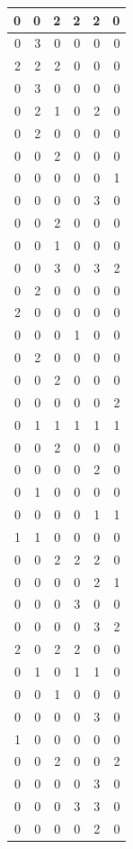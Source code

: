 \documentclass[
  12pt,
]{krantz}
\begin{document}
\begin{tabular}{r|r|r|r|r|r}
\hline
0 & 0 & 2 & 2 & 2 & 0\\
\hline
0 & 3 & 0 & 0 & 0 & 0\\
\hline
2 & 2 & 2 & 0 & 0 & 0\\
\hline
0 & 3 & 0 & 0 & 0 & 0\\
\hline
0 & 2 & 1 & 0 & 2 & 0\\
\hline
0 & 2 & 0 & 0 & 0 & 0\\
\hline
0 & 0 & 2 & 0 & 0 & 0\\
\hline
0 & 0 & 0 & 0 & 0 & 1\\
\hline
0 & 0 & 0 & 0 & 3 & 0\\
\hline
0 & 0 & 2 & 0 & 0 & 0\\
\hline
0 & 0 & 1 & 0 & 0 & 0\\
\hline
0 & 0 & 3 & 0 & 3 & 2\\
\hline
0 & 2 & 0 & 0 & 0 & 0\\
\hline
2 & 0 & 0 & 0 & 0 & 0\\
\hline
0 & 0 & 0 & 1 & 0 & 0\\
\hline
0 & 2 & 0 & 0 & 0 & 0\\
\hline
0 & 0 & 2 & 0 & 0 & 0\\
\hline
0 & 0 & 0 & 0 & 0 & 2\\
\hline
0 & 1 & 1 & 1 & 1 & 1\\
\hline
0 & 0 & 2 & 0 & 0 & 0\\
\hline
0 & 0 & 0 & 0 & 2 & 0\\
\hline
0 & 1 & 0 & 0 & 0 & 0\\
\hline
0 & 0 & 0 & 0 & 1 & 1\\
\hline
1 & 1 & 0 & 0 & 0 & 0\\
\hline
0 & 0 & 2 & 2 & 2 & 0\\
\hline
0 & 0 & 0 & 0 & 2 & 1\\
\hline
0 & 0 & 0 & 3 & 0 & 0\\
\hline
0 & 0 & 0 & 0 & 3 & 2\\
\hline
2 & 0 & 2 & 2 & 0 & 0\\
\hline
0 & 1 & 0 & 1 & 1 & 0\\
\hline
0 & 0 & 1 & 0 & 0 & 0\\
\hline
0 & 0 & 0 & 0 & 3 & 0\\
\hline
1 & 0 & 0 & 0 & 0 & 0\\
\hline
0 & 0 & 2 & 0 & 0 & 2\\
\hline
0 & 0 & 0 & 0 & 3 & 0\\
\hline
0 & 0 & 0 & 3 & 3 & 0\\
\hline
0 & 0 & 0 & 0 & 2 & 0\\

\end{tabular}
\end{document}
